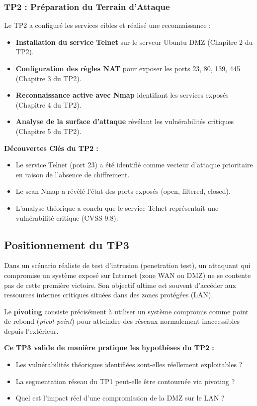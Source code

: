 \documentclass[12pt,a4paper,openany]{report}
\begin{document}
	\subsubsection{TP2 : Préparation du Terrain d'Attaque}
	Le TP2 a configuré les services cibles et réalisé une reconnaissance :
	\begin{itemize}
		\item \textbf{Installation du service Telnet} sur le serveur Ubuntu DMZ (Chapitre 2 du TP2).
		\item \textbf{Configuration des règles NAT} pour exposer les ports 23, 80, 139, 445 (Chapitre 3 du TP2).
		\item \textbf{Reconnaissance active avec Nmap} identifiant les services exposés (Chapitre 4 du TP2).
		\item \textbf{Analyse de la surface d'attaque} révélant les vulnérabilités critiques (Chapitre 5 du TP2).
	\end{itemize}
	
	\textbf{Découvertes Clés du TP2 :}
	\begin{itemize}
		\item Le service Telnet (port 23) a été identifié comme vecteur d'attaque prioritaire en raison de l'absence de chiffrement.
		\item Le scan Nmap a révélé l'état des ports exposés (open, filtered, closed).
		\item L'analyse théorique a conclu que le service Telnet représentait une vulnérabilité critique (CVSS 9.8).
	\end{itemize}
	
	\subsection{Positionnement du TP3}
	
	Dans un scénario réaliste de test d'intrusion (penetration test), un attaquant qui compromise un système exposé sur Internet (zone WAN ou DMZ) ne se contente pas de cette première victoire. Son objectif ultime est souvent d'accéder aux ressources internes critiques situées dans des zones protégées (LAN). 
	
	Le \textbf{pivoting} consiste précisément à utiliser un système compromis comme point de rebond (\textit{pivot point}) pour atteindre des réseaux normalement inaccessibles depuis l'extérieur.
	
	\textbf{Ce TP3 valide de manière pratique les hypothèses du TP2 :}
	\begin{itemize}
		\item Les vulnérabilités théoriques identifiées sont-elles réellement exploitables ?
		\item La segmentation réseau du TP1 peut-elle être contournée via pivoting ?
		\item Quel est l'impact réel d'une compromission de la DMZ sur le LAN ?
	\end{itemize}
	
\end{document}
